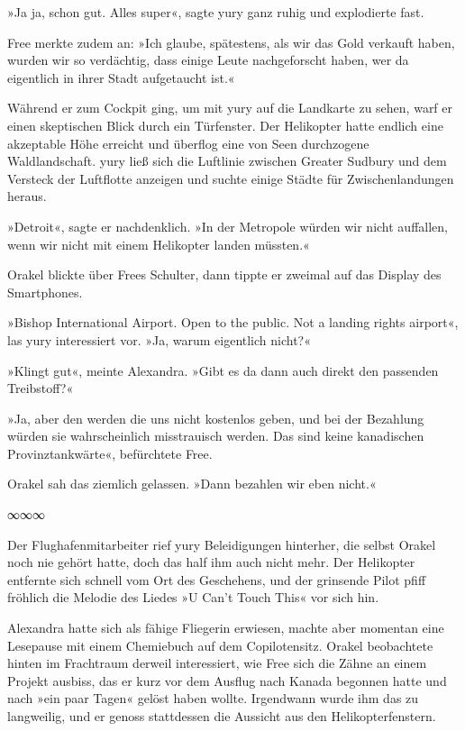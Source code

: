 »Ja ja, schon gut. Alles super«, sagte yury ganz ruhig und explodierte fast.

Free merkte zudem an: »Ich glaube, spätestens, als wir das Gold verkauft haben, wurden wir so verdächtig, dass einige Leute nachgeforscht haben, wer da eigentlich in ihrer Stadt aufgetaucht ist.«

Während er zum Cockpit ging, um mit yury auf die Landkarte zu sehen, warf er einen skeptischen Blick durch ein Türfenster. Der Helikopter hatte endlich eine akzeptable Höhe erreicht und überflog eine von Seen durchzogene Waldlandschaft. yury ließ sich die Luftlinie zwischen Greater Sudbury und dem Versteck der Luftflotte anzeigen und suchte einige Städte für Zwischenlandungen heraus.

»Detroit«, sagte er nachdenklich. »In der Metropole würden wir nicht auffallen, wenn wir nicht mit einem Helikopter landen müssten.«

Orakel blickte über Frees Schulter, dann tippte er zweimal auf das Display des Smartphones.

»Bishop International Airport. Open to the public. Not a landing rights airport«, las yury interessiert vor. »Ja, warum eigentlich nicht?«

»Klingt gut«, meinte Alexandra. »Gibt es da dann auch direkt den passenden Treibstoff?«

»Ja, aber den werden die uns nicht kostenlos geben, und bei der Bezahlung würden sie wahrscheinlich misstrauisch werden. Das sind keine kanadischen Provinztankwärte«, befürchtete Free.

Orakel sah das ziemlich gelassen. »Dann bezahlen wir eben nicht.«

\begin{center}
    ∞∞∞
\end{center}

Der Flughafenmitarbeiter rief yury Beleidigungen hinterher, die selbst Orakel noch nie gehört hatte, doch das half ihm auch nicht mehr. Der Helikopter entfernte sich schnell vom Ort des Geschehens, und der grinsende Pilot pfiff fröhlich die Melodie des Liedes »U Can’t Touch This« vor sich hin.

Alexandra hatte sich als fähige Fliegerin erwiesen, machte aber momentan eine Lesepause mit einem Chemiebuch auf dem Copilotensitz. Orakel beobachtete hinten im Frachtraum derweil interessiert, wie Free sich die Zähne an einem Projekt ausbiss, das er kurz vor dem Ausflug nach Kanada begonnen hatte und nach »ein paar Tagen« gelöst haben wollte. Irgendwann wurde ihm das zu langweilig, und er genoss stattdessen die Aussicht aus den Helikopterfenstern.

